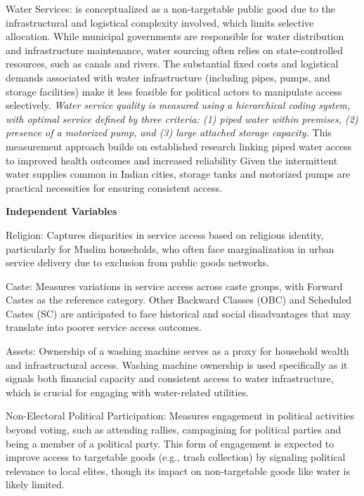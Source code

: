 Water Services: is conceptualized as a non-targetable public good due to the infrastructural and logistical complexity involved, which limits selective allocation. While municipal governments are responsible for water distribution and infrastructure maintenance, water sourcing often relies on state-controlled resources, such as canals and rivers. The substantial fixed costs and logistical demands associated with water infrastructure (including pipes, pumps, and storage facilities) make it less feasible for political actors to manipulate access selectively. \textit{Water service quality is measured using a hierarchical coding system, with optimal service defined by three criteria: (1) piped water within premises, (2) presence of a motorized pump, and (3) large attached storage capacity.} This measurement approach builds on established research linking piped water access to improved health outcomes \citep{jalan_does_2003} and increased reliability \citep{banerjee_africas_2011} Given the intermittent water supplies common in Indian cities, storage tanks and motorized pumps are practical necessities for ensuring consistent access.

\vspace{5mm}
\textbf{Independent Variables}


Religion: Captures disparities in service access based on religious identity, particularly for Muslim households, who often face marginalization in urban service delivery due to exclusion from public goods networks.

Caste: Measures variations in service access across caste groups, with Forward Castes as the reference category. Other Backward Classes (OBC) and Scheduled Castes (SC) are anticipated to face historical and social disadvantages that may translate into poorer service access outcomes.

Assets: Ownership of a washing machine serves as a proxy for household wealth and infrastructural access. Washing machine ownership is used specifically as it signals both financial capacity and consistent access to water infrastructure, which is crucial for engaging with water-related utilities.

Non-Electoral Political Participation: Measures engagement in political activities beyond voting, such as attending rallies, campagining for political parties and being a member of a political party. This form of engagement is expected to improve access to targetable goods (e.g., trash collection) by signaling political relevance to local elites, though its impact on non-targetable goods like water is likely limited.

